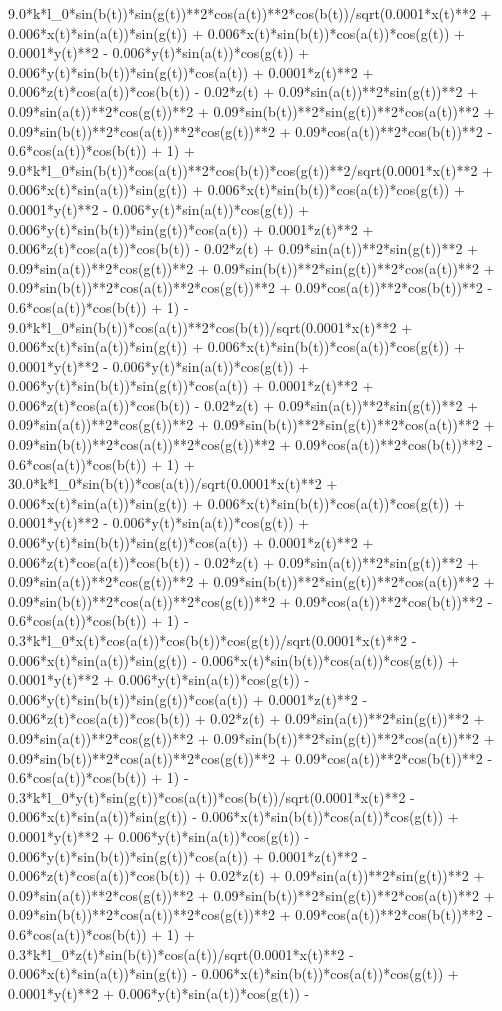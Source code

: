 9.0*k*l_0*sin(b(t))*sin(g(t))**2*cos(a(t))**2*cos(b(t))/sqrt(0.0001*x(t)**2 + 0.006*x(t)*sin(a(t))*sin(g(t)) + 0.006*x(t)*sin(b(t))*cos(a(t))*cos(g(t)) + 0.0001*y(t)**2 - 0.006*y(t)*sin(a(t))*cos(g(t)) + 0.006*y(t)*sin(b(t))*sin(g(t))*cos(a(t)) + 0.0001*z(t)**2 + 0.006*z(t)*cos(a(t))*cos(b(t)) - 0.02*z(t) + 0.09*sin(a(t))**2*sin(g(t))**2 + 0.09*sin(a(t))**2*cos(g(t))**2 + 0.09*sin(b(t))**2*sin(g(t))**2*cos(a(t))**2 + 0.09*sin(b(t))**2*cos(a(t))**2*cos(g(t))**2 + 0.09*cos(a(t))**2*cos(b(t))**2 - 0.6*cos(a(t))*cos(b(t)) + 1) + 9.0*k*l_0*sin(b(t))*cos(a(t))**2*cos(b(t))*cos(g(t))**2/sqrt(0.0001*x(t)**2 + 0.006*x(t)*sin(a(t))*sin(g(t)) + 0.006*x(t)*sin(b(t))*cos(a(t))*cos(g(t)) + 0.0001*y(t)**2 - 0.006*y(t)*sin(a(t))*cos(g(t)) + 0.006*y(t)*sin(b(t))*sin(g(t))*cos(a(t)) + 0.0001*z(t)**2 + 0.006*z(t)*cos(a(t))*cos(b(t)) - 0.02*z(t) + 0.09*sin(a(t))**2*sin(g(t))**2 + 0.09*sin(a(t))**2*cos(g(t))**2 + 0.09*sin(b(t))**2*sin(g(t))**2*cos(a(t))**2 + 0.09*sin(b(t))**2*cos(a(t))**2*cos(g(t))**2 + 0.09*cos(a(t))**2*cos(b(t))**2 - 0.6*cos(a(t))*cos(b(t)) + 1) - 9.0*k*l_0*sin(b(t))*cos(a(t))**2*cos(b(t))/sqrt(0.0001*x(t)**2 + 0.006*x(t)*sin(a(t))*sin(g(t)) + 0.006*x(t)*sin(b(t))*cos(a(t))*cos(g(t)) + 0.0001*y(t)**2 - 0.006*y(t)*sin(a(t))*cos(g(t)) + 0.006*y(t)*sin(b(t))*sin(g(t))*cos(a(t)) + 0.0001*z(t)**2 + 0.006*z(t)*cos(a(t))*cos(b(t)) - 0.02*z(t) + 0.09*sin(a(t))**2*sin(g(t))**2 + 0.09*sin(a(t))**2*cos(g(t))**2 + 0.09*sin(b(t))**2*sin(g(t))**2*cos(a(t))**2 + 0.09*sin(b(t))**2*cos(a(t))**2*cos(g(t))**2 + 0.09*cos(a(t))**2*cos(b(t))**2 - 0.6*cos(a(t))*cos(b(t)) + 1) + 30.0*k*l_0*sin(b(t))*cos(a(t))/sqrt(0.0001*x(t)**2 + 0.006*x(t)*sin(a(t))*sin(g(t)) + 0.006*x(t)*sin(b(t))*cos(a(t))*cos(g(t)) + 0.0001*y(t)**2 - 0.006*y(t)*sin(a(t))*cos(g(t)) + 0.006*y(t)*sin(b(t))*sin(g(t))*cos(a(t)) + 0.0001*z(t)**2 + 0.006*z(t)*cos(a(t))*cos(b(t)) - 0.02*z(t) + 0.09*sin(a(t))**2*sin(g(t))**2 + 0.09*sin(a(t))**2*cos(g(t))**2 + 0.09*sin(b(t))**2*sin(g(t))**2*cos(a(t))**2 + 0.09*sin(b(t))**2*cos(a(t))**2*cos(g(t))**2 + 0.09*cos(a(t))**2*cos(b(t))**2 - 0.6*cos(a(t))*cos(b(t)) + 1) - 0.3*k*l_0*x(t)*cos(a(t))*cos(b(t))*cos(g(t))/sqrt(0.0001*x(t)**2 - 0.006*x(t)*sin(a(t))*sin(g(t)) - 0.006*x(t)*sin(b(t))*cos(a(t))*cos(g(t)) + 0.0001*y(t)**2 + 0.006*y(t)*sin(a(t))*cos(g(t)) - 0.006*y(t)*sin(b(t))*sin(g(t))*cos(a(t)) + 0.0001*z(t)**2 - 0.006*z(t)*cos(a(t))*cos(b(t)) + 0.02*z(t) + 0.09*sin(a(t))**2*sin(g(t))**2 + 0.09*sin(a(t))**2*cos(g(t))**2 + 0.09*sin(b(t))**2*sin(g(t))**2*cos(a(t))**2 + 0.09*sin(b(t))**2*cos(a(t))**2*cos(g(t))**2 + 0.09*cos(a(t))**2*cos(b(t))**2 - 0.6*cos(a(t))*cos(b(t)) + 1) - 0.3*k*l_0*y(t)*sin(g(t))*cos(a(t))*cos(b(t))/sqrt(0.0001*x(t)**2 - 0.006*x(t)*sin(a(t))*sin(g(t)) - 0.006*x(t)*sin(b(t))*cos(a(t))*cos(g(t)) + 0.0001*y(t)**2 + 0.006*y(t)*sin(a(t))*cos(g(t)) - 0.006*y(t)*sin(b(t))*sin(g(t))*cos(a(t)) + 0.0001*z(t)**2 - 0.006*z(t)*cos(a(t))*cos(b(t)) + 0.02*z(t) + 0.09*sin(a(t))**2*sin(g(t))**2 + 0.09*sin(a(t))**2*cos(g(t))**2 + 0.09*sin(b(t))**2*sin(g(t))**2*cos(a(t))**2 + 0.09*sin(b(t))**2*cos(a(t))**2*cos(g(t))**2 + 0.09*cos(a(t))**2*cos(b(t))**2 - 0.6*cos(a(t))*cos(b(t)) + 1) + 0.3*k*l_0*z(t)*sin(b(t))*cos(a(t))/sqrt(0.0001*x(t)**2 - 0.006*x(t)*sin(a(t))*sin(g(t)) - 0.006*x(t)*sin(b(t))*cos(a(t))*cos(g(t)) + 0.0001*y(t)**2 + 0.006*y(t)*sin(a(t))*cos(g(t)) - 